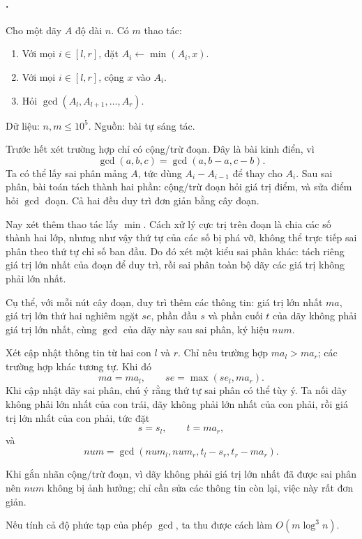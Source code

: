 \documentclass[11pt]{article}
\begin{document}
\paragraph{.}
Cho một dãy \(A\) độ dài \(n\). Có \(m\) thao tác:
\begin{enumerate}
  \item Với mọi \(i\in[l,r]\), đặt \(A_i\leftarrow \min(A_i,x)\).
  \item Với mọi \(i\in[l,r]\), cộng \(x\) vào \(A_i\).
  \item Hỏi \(\gcd(A_l,A_{l+1},\ldots,A_r)\).
\end{enumerate}
Dữ liệu: \(n,m\le 10^5\). Nguồn: bài tự sáng tác.

Trước hết xét trường hợp chỉ có cộng/trừ đoạn. Đây là bài kinh điển, vì
\[
  \gcd(a,b,c)=\gcd(a,b-a,c-b).
\]
Ta có thể lấy sai phân mảng \(A\), tức dùng \(A_i-A_{i-1}\) để thay cho
\(A_i\). Sau sai phân, bài toán tách thành hai phần: cộng/trừ đoạn hỏi giá
trị điểm, và sửa điểm hỏi \(\gcd\) đoạn. Cả hai đều duy trì đơn giản bằng cây
đoạn.

Nay xét thêm thao tác lấy \(\min\). Cách xử lý cực trị trên đoạn là chia các
số thành hai lớp, nhưng như vậy thứ tự của các số bị phá vỡ, không thể trực
tiếp sai phân theo thứ tự chỉ số ban đầu. Do đó xét một kiểu sai phân khác:
tách riêng giá trị lớn nhất của đoạn để duy trì, rồi sai phân toàn bộ dãy
các giá trị không phải lớn nhất.

Cụ thể, với mỗi nút cây đoạn, duy trì thêm các thông tin: giá trị lớn nhất
\(ma\), giá trị lớn thứ hai nghiêm ngặt \(se\), phần đầu \(s\) và phần cuối
\(t\) của dãy không phải giá trị lớn nhất, cùng \(\gcd\) của dãy này sau sai
phân, ký hiệu \(\mathit{num}\).

Xét cập nhật thông tin từ hai con \(l\) và \(r\). Chỉ nêu trường hợp
\(ma_l>ma_r\); các trường hợp khác tương tự. Khi đó
\[
  ma=ma_l,\qquad se=\max(se_l,ma_r).
\]
Khi cập nhật dãy sai phân, chú ý rằng thứ tự sai phân có thể tùy ý. Ta nối
dãy không phải lớn nhất của con trái, dãy không phải lớn nhất của con phải,
rồi giá trị lớn nhất của con phải, tức đặt
\[
  s=s_l,\qquad t=ma_r,
\]
và
\[
  \mathit{num}=\gcd(\mathit{num}_l,\mathit{num}_r,t_l-s_r,t_r-ma_r).
\]

Khi gắn nhãn cộng/trừ đoạn, vì dãy không phải giá trị lớn nhất đã được sai
phân nên \(\mathit{num}\) không bị ảnh hưởng; chỉ cần sửa các thông tin còn
lại, việc này rất đơn giản.

Nếu tính cả độ phức tạp của phép \(\gcd\), ta thu được cách làm
\(O(m\log^3 n)\).
\end{document}
